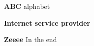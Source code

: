 \textbf{}
\label{term_isp3}


\textbf{ABC}
\label{term_abc}
alphabet

\textbf{Internet service provider}
\label{term_isp}


\textbf{Zeeee}
\label{term_zzz}
In the end

